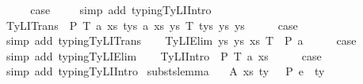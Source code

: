 \begin{isabellebody}
\ \ \isamarkupfalse%
\ \isamarkupfalse%
\ {\isacharquery}{\kern0pt}case\ \isanewline
\ \ \isamarkupfalse%
\ {\isacharparenleft}{\kern0pt}simp\ add{\isacharcolon}{\kern0pt}\ typing{\isachardot}{\kern0pt}TyLIIntro{\isacharparenright}{\kern0pt}\isanewline
{}\isamarkupfalse%
\isanewline
\ \ \isamarkupfalse%
\ {\isacharparenleft}{\kern0pt}TyLITrans\ {\isasymGamma}\ P\ T{}\ a{}\ xs{}\ tys{}\ a{}\ xs{}\ ys{}\ T{}\ tys{}\ ys{}\ ys{\isacharparenright}{\kern0pt}\isanewline
\ \ \isamarkupfalse%
\ \isamarkupfalse%
\ {\isacharquery}{\kern0pt}case\ \isanewline
\ \ \isamarkupfalse%
\ {\isacharparenleft}{\kern0pt}simp\ add{\isacharcolon}{\kern0pt}\ typing{\isachardot}{\kern0pt}TyLITrans{\isacharparenright}{\kern0pt}\isanewline
{}\isamarkupfalse%
\isanewline
\ \ \isamarkupfalse%
\ {\isacharparenleft}{\kern0pt}TyLIElim{}\ ys\ ys{\isacharprime}{\kern0pt}\ xs\ T\ {\isasymGamma}\ P\ a{\isacharparenright}{\kern0pt}\isanewline
\ \ \isamarkupfalse%
\ \isamarkupfalse%
\ {\isacharquery}{\kern0pt}case\ \isanewline
\ \ \isamarkupfalse%
\ {\isacharparenleft}{\kern0pt}simp\ add{\isacharcolon}{\kern0pt}\ typing{\isachardot}{\kern0pt}TyLIElim{}{\isacharparenright}{\kern0pt}\isanewline
{}\isamarkupfalse%
\isanewline
\ \ \isamarkupfalse%
\ {\isacharparenleft}{\kern0pt}TyLIIntro{}\ {\isasymGamma}\ P\ T\ a\ xs{\isacharparenright}{\kern0pt}\isanewline
\ \ \isamarkupfalse%
\ \isamarkupfalse%
\ {\isacharquery}{\kern0pt}case\ \isanewline
\ \ \isamarkupfalse%
\ {\isacharparenleft}{\kern0pt}simp\ add{\isacharcolon}{\kern0pt}\ typing{\isachardot}{\kern0pt}TyLIIntro{}{\isacharparenright}{\kern0pt}\isanewline
{}\isamarkupfalse%
%
\endisatagproof
{\isafoldproof}%
%
\isadelimproof
\isanewline
%
\endisadelimproof
\isanewline
\isanewline
{}\isamarkupfalse%
\ substs{\isacharunderscore}{\kern0pt}lemma{}{\isacharcolon}{\kern0pt}\isanewline
\ \ \ A{}{\isacharcolon}{\kern0pt}\ {\isachardoublequoteopen}{\isacharparenleft}{\kern0pt}xs{\isacharcomma}{\kern0pt}\ ty{\isacharparenright}{\kern0pt}\ {\isacharhash}{\kern0pt}\ {\isasymGamma}{}\ {\isasymturnstile}{\isacharbraceleft}{\kern0pt}P{\isacharbraceright}{\kern0pt}\ e{}\ {\isacharcolon}{\kern0pt}\ ty{}{\isachardoublequoteclose}\isanewline

\end{isabellebody}
